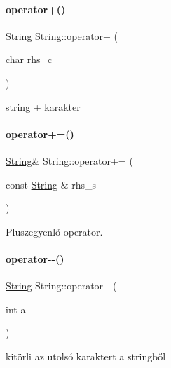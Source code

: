 \paragraph{\texorpdfstring{operator+()}{operator+()}\hspace{0.1cm}{\footnotesize\ttfamily [2/2]}}
{\footnotesize\ttfamily \mbox{\hyperlink{class_string}{String}} String\+::operator+ (\begin{DoxyParamCaption}\item[{char}]{rhs\+\_\+c }\end{DoxyParamCaption})\hspace{0.3cm}{\ttfamily [inline]}}



string + karakter 

\mbox{\label{class_string_ac203e7c52e04bb86f62f9dd75527b361}} 
\paragraph{\texorpdfstring{operator+=()}{operator+=()}}
{\footnotesize\ttfamily \mbox{\hyperlink{class_string}{String}}\& String\+::operator+= (\begin{DoxyParamCaption}\item[{const \mbox{\hyperlink{class_string}{String}} \&}]{rhs\+\_\+s }\end{DoxyParamCaption})\hspace{0.3cm}{\ttfamily [inline]}}



Pluszegyenlő operator. 

\mbox{\label{class_string_a79869b69dd0106b1b6d179f760d6527a}} 
\paragraph{\texorpdfstring{operator-\/-\/()}{operator--()}}
{\footnotesize\ttfamily \mbox{\hyperlink{class_string}{String}} String\+::operator-\/-\/ (\begin{DoxyParamCaption}\item[{int}]{a }\end{DoxyParamCaption})}



kitörli az utolsó karaktert a stringből 

\mbox{\label{class_string_a803e6112834d4c0cdb0da6c6a4000e6e}} 
